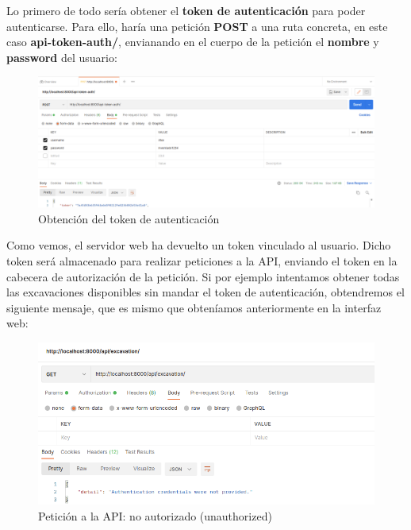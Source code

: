 Lo primero de todo sería obtener el \textbf{token de autenticación} para poder autenticarse.
Para ello, haría una petición \textbf{POST} a una ruta concreta, en este caso
\textbf{api-token-auth/}, envianando en el cuerpo de la petición el \textbf{nombre} y
\textbf{password} del usuario:

        \begin{figure}[H]
            \centering
            \includegraphics[scale=0.25]{imagenes/get-token.png}
            \caption{Obtención del token de autenticación}
            \label{fig:get-token}
        \end{figure}

Como vemos, el servidor web ha devuelto un token vinculado al usuario. Dicho token será
almacenado para realizar peticiones a la API, enviando el token en la cabecera de
autorización de la petición. Si por ejemplo intentamos obtener todas las excavaciones
disponibles sin mandar el token de autenticación, obtendremos el siguiente mensaje, que es
mismo que obteníamos anteriormente en la interfaz web:

    \begin{figure}[H]
        \centering
        \includegraphics[scale=0.45]{imagenes/unauthorized2.png}
        \caption{Petición a la API: no autorizado (unauthorized)}
        \label{fig:unauthorized2}
    \end{figure}

